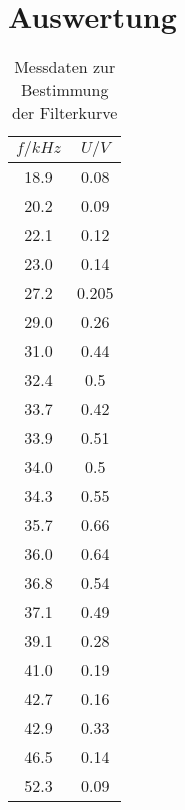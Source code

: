 \section{Auswertung}
\label{sec:Auswertung}


\begin{table}
  \centering
  \caption{Messdaten zur Bestimmung der Filterkurve}
  \label{tab:WS}
  \begin{tabular}{c c}
  \toprule
  $f / \si{kHz}$	& $U / \si{V}$ \\
  \midrule
	18.9	& 0.08  \\
	20.2	& 0.09  \\
	22.1	& 0.12  \\
	23.0	& 0.14  \\
	27.2	& 0.205 \\
	29.0	& 0.26  \\
	31.0	& 0.44  \\
	32.4	& 0.5   \\
	33.7	& 0.42  \\
	33.9	& 0.51  \\
	34.0	& 0.5   \\
	34.3	& 0.55  \\
	35.7	& 0.66  \\
	36.0	& 0.64  \\
	36.8	& 0.54  \\
	37.1	& 0.49  \\
	39.1	& 0.28  \\
	41.0	& 0.19  \\
	42.7	& 0.16  \\
	42.9	& 0.33  \\
	46.5	& 0.14  \\
	52.3	& 0.09  \\
  \bottomrule
  \end{tabular}
\end{table}


